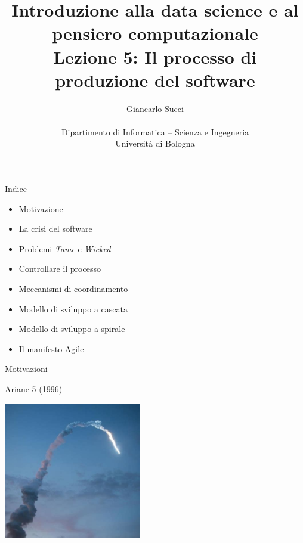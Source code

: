 \documentclass{beamer}
\title[L02]{Introduzione alla data science e al pensiero computazionale\\
Lezione 5: Il processo di produzione del software} %
\author[{\tiny Giancarlo Succi }]{Giancarlo Succi\\\\ Dipartimento di Informatica -- Scienza e Ingegneria\\Universit\`{a} di Bologna\\
\bftt{g.succi@unibo.it}
} %
\institute[unibo] %
\date{} %
\begin{document}
\begin{frame}
\titlepage %

\end{frame}




\begin{frame}
{\centerline{Indice}}
\begin{itemize}
    \item Motivazione
    \item La crisi del software
    \item Problemi \textit{Tame} e \textit{Wicked}
    \item Controllare il processo
    \item Meccanismi di coordinamento
    \item Modello di sviluppo a cascata
    \item Modello di sviluppo a spirale
    \item Il manifesto Agile
\end{itemize} 
\end{frame}

\begin{frame}{\centerline{Motivazioni}}

\begin{center}
{\Large
Ariane 5 (1996)\\
}
\end{center}
\begin{center}
\includegraphics[width=60mm]{A2022.IDSEPC.ProcessoDiProduzione/Ariane5.jpeg}
\end{center}

\end{frame}
\end{document}
